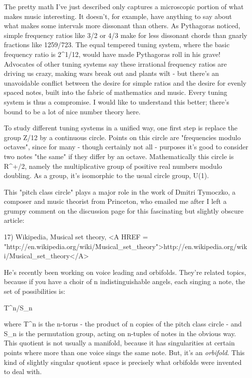 The pretty math I've just described only captures a microscopic 
portion of what makes music interesting.  It doesn't, for example,
have anything to say about what makes some intervals more dissonant
than others.  As Pythagoras noticed, simple frequency ratios like 
3/2 or 4/3 make for less dissonant chords than gnarly fractions 
like 1259/723.  The equal tempered tuning system, where the basic
frequency ratio is 2^{1/12}, would have made Pythagoras roll in 
his grave!   Advocates of other tuning systems say these irrational 
frequency ratios are driving us crazy, making wars break out and 
plants wilt - but there's an unavoidable conflict between the desire 
for simple ratios and the desire for evenly spaced notes, built into 
the fabric of mathematics and music.  Every tuning system is thus a
compromise.  I would like to understand this better; there's bound 
to be a lot of nice number theory here.

To study different tuning systems in a unified way, one first step
is replace the group Z/12 by a continuous circle.  Points on this
circle are "frequencies modulo octaves", since for many - though 
certainly not all - purposes it's good to consider two notes 
"the same" if they differ by an octave.  Mathematically this circle 
is R^{+}/2, namely the multiplicative group of positive real numbers 
modulo doubling.  As a group, it's isomorphic to the usual circle
group, U(1). 

This "pitch class circle" plays a major role in the work of Dmitri 
Tymoczko, a composer and music theorist from Princeton, who emailed 
me after I left a grumpy comment on the discussion page for this 
fascinating but slightly obscure article:

17) Wikipedia, Musical set theory,
<A HREF = "http://en.wikipedia.org/wiki/Musical_set_theory">http://en.wikipedia.org/wiki/Musical_set_theory</A>

He's recently been working on voice leading and orbifolds.  They're 
related topics, because if you have a choir of n indistinguishable 
angels, each singing a note, the set of possibilities is:

T^{n}/S_{n}

where T^{n} is the n-torus - the product of n copies of the
pitch class circle - and S_{n} is the permutation group,
acting on n-tuples of notes in the obvious way.  This quotient is not
usually a manifold, because it has singularities at certain points
where more than one voice sings the same note.  But, it's an
\emph{orbifold}.  This kind of slightly singular quotient space is
precisely what orbifolds were invented to deal with.

